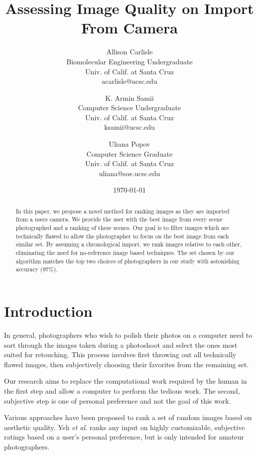 \documentclass[twocolumn]{article}
\title{
   Assessing Image Quality on Import From Camera
} %
\author{
   Allison Carlisle\\
   Biomolecular Engineering Undergraduate\\
   Univ. of Calif. at Santa Cruz\\
   acarlisle@ucsc.edu
  \and
   K. Armin Samii\\
   Computer Science Undergraduate\\
   Univ. of Calif. at Santa Cruz\\
   ksamii@ucsc.edu
  \and
   Uliana Popov\\
   Computer Science Graduate\\
   Univ. of Calif. at Santa Cruz\\
   uliana@soe.ucsc.edu
}
\date{\today}
\begin{document}
\maketitle

\begin{abstract}
In this paper, we propose a novel method for ranking images as they are imported from a users camera. We provide the user with the best image from every scene photographed and a ranking of these scenes. Our goal is to filter images which are technically flawed to allow the photographer to focus on the best image from each similar set. By assuming a chronological import, we rank images relative to each other, eliminating the need for no-reference image based techniques. The set chosen by our algorithm matches the top two choices of photographers in our study with astonishing accuracy (97\%).
\end{abstract}

\section{Introduction}
In general, photographers who wish to polish their photos on a computer need to sort through the images taken during a photoshoot and select the ones most suited for retouching. This process involves first throwing out all technically flawed images, then subjectively choosing their favorites from the remaining set.

Our research aims to replace the computational work required by the human in the first step and allow a computer to perform the tedious work. The second, subjective step is one of personal preference and not the goal of this work.

Various approaches have been proposed to rank a set of random images based on aesthetic quality. Yeh \textit{et al.}\cite{Yeh:2010:PPR:1873951.1873963} ranks any input on highly customizable, subjective ratings based on a user's personal preference, but is only intended for amateur photographers. 



\end{document}
